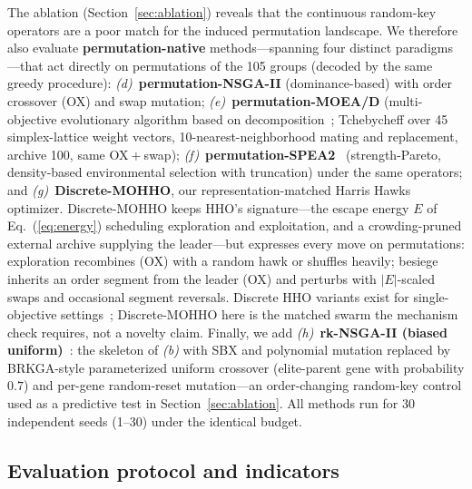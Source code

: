 \documentclass[runningheads]{llncs}
\begin{document}
The ablation (Section~\ref{sec:ablation}) reveals that the continuous random-key operators are a poor match for the induced permutation landscape. We therefore also evaluate \textbf{permutation-native} methods---spanning four distinct paradigms---that act directly on permutations of the 105 groups (decoded by the same greedy procedure): \emph{(d)}~\textbf{permutation-NSGA-II} (dominance-based) with order crossover (OX) and swap mutation; \emph{(e)}~\textbf{permutation-MOEA/D} (multi-objective evolutionary algorithm based on decomposition~\cite{zhangli}; Tchebycheff over 45 simplex-lattice weight vectors, 10-nearest-neighborhood mating and replacement, archive 100, same OX${}+{}$swap); \emph{(f)}~\textbf{permutation-SPEA2}~\cite{spea2} (strength-Pareto, density-based environmental selection with truncation) under the same operators; and \emph{(g)}~\textbf{Discrete-MOHHO}, our representation-matched Harris Hawks optimizer. Discrete-MOHHO keeps HHO's signature---the escape energy $E$ of Eq.~(\ref{eq:energy}) scheduling exploration and exploitation, and a crowding-pruned external archive supplying the leader---but expresses every move on permutations: exploration recombines (OX) with a random hawk or shuffles heavily; besiege inherits an order segment from the leader (OX) and perturbs with $|E|$-scaled swaps and occasional segment reversals. Discrete HHO variants exist for single-objective settings~\cite{gezici}; Discrete-MOHHO here is the matched swarm the mechanism check requires, not a novelty claim. Finally, we add \emph{(h)}~\textbf{rk-NSGA-II (biased uniform)}~\cite{goncalves}: the skeleton of \emph{(b)} with SBX and polynomial mutation replaced by BRKGA-style parameterized uniform crossover (elite-parent gene with probability $0.7$) and per-gene random-reset mutation---an order-changing random-key control used as a predictive test in Section~\ref{sec:ablation}. All methods run for 30 independent seeds (1--30) under the identical budget.

\subsection{Evaluation protocol and indicators}
\label{sec:protocol}
\end{document}

